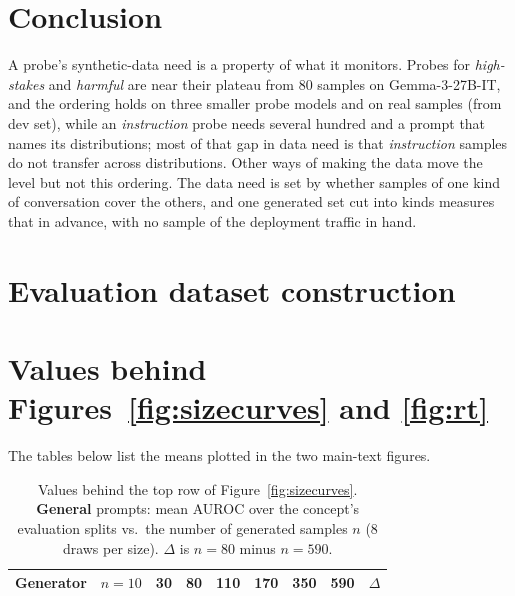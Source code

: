 \documentclass{article} %
\newcommand{\hs}{\emph{high-stakes}}
\newcommand{\harm}{\emph{harmful}}
\newcommand{\instr}{\emph{instruction}}
\begin{document}
\section{Conclusion}
\label{sec:conclusion}
A probe's synthetic-data need is a property of what it monitors. Probes for \hs{} and \harm{} are near their plateau from 80 samples on Gemma-3-27B-IT, and the ordering holds on three smaller probe models and on real samples (from dev set), while an \instr{} probe needs several hundred and a prompt that names its distributions; most of that gap in data need is that \instr{} samples do not transfer across distributions. Other ways of making the data move the level but not this ordering. The data need is set by whether samples of one kind of conversation cover the others, and one generated set cut into kinds measures that in advance, with no sample of the deployment traffic in hand.




\newpage
\appendix
\raggedbottom

\section{Evaluation dataset construction}
\label{app:evalsets}


\section{Values behind Figures~\ref{fig:sizecurves} and \ref{fig:rt}}
\label{app:tables}
The tables below list the means plotted in the two main-text figures.

\begin{table}[H]
  \caption{Values behind the top row of Figure~\ref{fig:sizecurves}. \textbf{General} prompts: mean AUROC over the concept's evaluation splits vs.\ the number of generated samples $n$ (8 draws per size). $\Delta$ is $n{=}80$ minus $n{=}590$.}
  \label{tab:unsteered}
  \centering\small
  \setlength{\tabcolsep}{4pt}
  \begin{tabular}{lcccccccr}
    \toprule
    Generator & $n{=}10$ & 30 & 80 & 110 & 170 & 350 & 590 & $\Delta$ \\
    \midrule
    
  \end{tabular}
\end{table}
\end{document}
